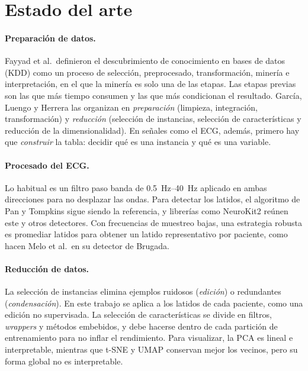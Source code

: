 \clearpage
\section{Estado del arte}\label{sec:estado}

\paragraph{Preparación de datos.} Fayyad et al.\ definieron el descubrimiento de conocimiento en bases de datos (KDD) como un proceso de selección, preprocesado, transformación, minería e interpretación, en el que la minería es solo una de las etapas. Las etapas previas son las que más tiempo consumen y las que más condicionan el resultado. García, Luengo y Herrera las organizan en \emph{preparación} (limpieza, integración, transformación) y \emph{reducción} (selección de instancias, selección de características y reducción de la dimensionalidad). En señales como el ECG, además, primero hay que \emph{construir} la tabla: decidir qué es una instancia y qué es una variable.

\paragraph{Procesado del ECG.} Lo habitual es un filtro paso banda de \SIrange{0.5}{40}{\hertz} aplicado en ambas direcciones para no desplazar las ondas. Para detectar los latidos, el algoritmo de Pan y Tompkins sigue siendo la referencia, y librerías como NeuroKit2 reúnen este y otros detectores. Con frecuencias de muestreo bajas, una estrategia robusta es promediar latidos para obtener un latido representativo por paciente, como hacen Melo et al.\ en su detector de Brugada.

\paragraph{Reducción de datos.} La selección de instancias elimina ejemplos ruidosos (\emph{edición}) o redundantes (\emph{condensación}). En este trabajo se aplica a los latidos de cada paciente, como una edición no supervisada. La selección de características se divide en filtros, \emph{wrappers} y métodos embebidos, y debe hacerse dentro de cada partición de entrenamiento para no inflar el rendimiento. Para visualizar, la PCA es lineal e interpretable, mientras que t-SNE y UMAP conservan mejor los vecinos, pero su forma global no es interpretable.

